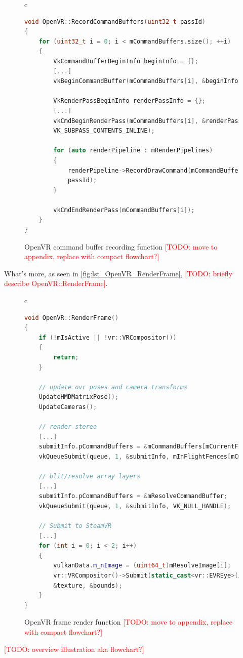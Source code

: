 \begin{figure}[htb]
  \centering
  \begin{tabular}{c}
  \begin{lstlisting}[language=C++]
void OpenVR::RecordCommandBuffers(uint32_t passId)
{
	for (uint32_t i = 0; i < mCommandBuffers.size(); ++i)
	{
		VkCommandBufferBeginInfo beginInfo = {};
		[...]
		vkBeginCommandBuffer(mCommandBuffers[i], &beginInfo);

		VkRenderPassBeginInfo renderPassInfo = {};
		[...]
		vkCmdBeginRenderPass(mCommandBuffers[i], &renderPassInfo, 
		VK_SUBPASS_CONTENTS_INLINE);

		for (auto renderPipeline : mRenderPipelines)
		{
			renderPipeline->RecordDrawCommand(mCommandBuffers[i], 
			passId);
		}

		vkCmdEndRenderPass(mCommandBuffers[i]);
	}
}
	\end{lstlisting}
  \end{tabular}
  \caption[OpenVR render target's RecordCommandBuffers]{OpenVR command buffer recording function \textcolor{red}{[TODO: move to appendix, replace with compact flowchart?]}}\label{fig:lst_OpenVR_RecordCommandBuffers}
\end{figure}

What's more, as seen in \autoref{fig:lst_OpenVR_RenderFrame}, \textcolor{red}{[TODO: briefly describe OpenVR::RenderFrame]}. \\

\begin{figure}[htb]
  \centering
  \begin{tabular}{c}
  \begin{lstlisting}[language=C++]
void OpenVR::RenderFrame()
{
	if (!mIsActive || !vr::VRCompositor())
	{
		return;
	}

	// update ovr poses and camera transforms
	UpdateHMDMatrixPose();
	UpdateCameras();

	// render stereo
	[...]
	submitInfo.pCommandBuffers = &mCommandBuffers[mCurrentFrame];
	vkQueueSubmit(queue, 1, &submitInfo, mInFlightFences[mCurrentFrame]);

	// blit/resolve array layers
	[...]
	submitInfo.pCommandBuffers = &mResolveCommandBuffer;
	vkQueueSubmit(queue, 1, &submitInfo, VK_NULL_HANDLE);

	// Submit to SteamVR
	[...]
	for (int i = 0; i < 2; i++)
	{
		vulkanData.m_nImage = (uint64_t)mResolveImage[i];
		vr::VRCompositor()->Submit(static_cast<vr::EVREye>(i), 
		&texture, &bounds);
	}
}
	\end{lstlisting}
  \end{tabular}
  \caption[OpenVR render target's RenderFrame]{OpenVR frame render function \textcolor{red}{[TODO: move to appendix, replace with compact flowchart?]}}\label{fig:lst_OpenVR_RenderFrame}
\end{figure}

\textcolor{red}{[TODO: overview illustration aka flowchart?]}